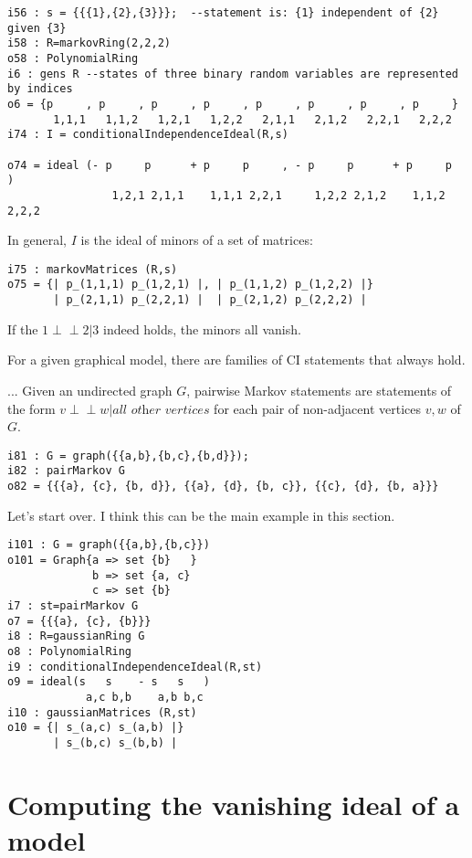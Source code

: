 \documentclass[letterpaper]{article}
\theoremstyle{definition}
\def\ci{\perp\!\!\!\perp}
\begin{document}
\begin{verbatim}
i56 : s = {{{1},{2},{3}}};  --statement is: {1} independent of {2} given {3}
i58 : R=markovRing(2,2,2) 
o58 : PolynomialRing
i6 : gens R --states of three binary random variables are represented by indices
o6 = {p     , p     , p     , p     , p     , p     , p     , p     }
       1,1,1   1,1,2   1,2,1   1,2,2   2,1,1   2,1,2   2,2,1   2,2,2
i74 : I = conditionalIndependenceIdeal(R,s)

o74 = ideal (- p     p      + p     p     , - p     p      + p     p     )
                1,2,1 2,1,1    1,1,1 2,2,1     1,2,2 2,1,2    1,1,2 2,2,2
\end{verbatim}
In general, $I$ is the ideal of minors of a set of matrices: 
\begin{verbatim}
i75 : markovMatrices (R,s)
o75 = {| p_(1,1,1) p_(1,2,1) |, | p_(1,1,2) p_(1,2,2) |}
       | p_(2,1,1) p_(2,2,1) |  | p_(2,1,2) p_(2,2,2) |
\end{verbatim}
If the $1\ci 2 | 3$  indeed holds, the minors all vanish. 


For a given graphical model, there are families of CI statements that always hold. 

...
Given an undirected graph $G$, pairwise Markov statements are statements of the form $v \ci w | \textit{all other vertices}$ for each pair of non-adjacent vertices $v, w$ of $G$. 
\begin{verbatim}
i81 : G = graph({{a,b},{b,c},{b,d}}); 
i82 : pairMarkov G
o82 = {{{a}, {c}, {b, d}}, {{a}, {d}, {b, c}}, {{c}, {d}, {b, a}}}
\end{verbatim}

Let's start over. I think this can be the main example in this section. 

\begin{verbatim}
i101 : G = graph({{a,b},{b,c}})
o101 = Graph{a => set {b}   }
             b => set {a, c}
             c => set {b}
i7 : st=pairMarkov G
o7 = {{{a}, {c}, {b}}}
i8 : R=gaussianRing G
o8 : PolynomialRing
i9 : conditionalIndependenceIdeal(R,st)
o9 = ideal(s   s    - s   s   )
            a,c b,b    a,b b,c
i10 : gaussianMatrices (R,st)
o10 = {| s_(a,c) s_(a,b) |}
       | s_(b,c) s_(b,b) |
\end{verbatim}


\section{Computing the vanishing ideal of a model}
\end{document}
